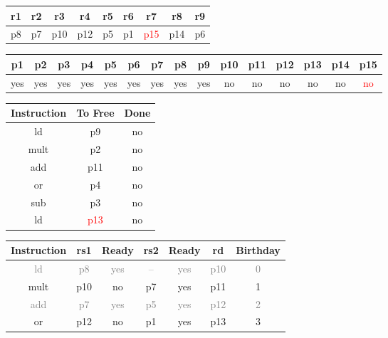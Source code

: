 \documentclass[12pt]{article}
\begin{document}
\begin{enumerate}
			\begin{table}[H]
				\begin{tabular}{|c|c|c|c|c|c|c|c|c|}
					\hline
					r1 & r2 & r3 & r4 & r5 & r6 & r7 & r8 & r9\\
					\hline
					p8 & p7 & p10 & p12 & p5 & p1 & \textcolor{red}{p15} & p14 & p6\\
					\hline
				\end{tabular}
			\end{table}
			\begin{table}[H]
				\begin{tabular}{|c|c|c|c|c|c|c|c|c|c|c|c|c|c|c|}
					\hline
					p1 & p2 & p3 & p4 & p5 & p6 & p7 & p8 & p9 & p10 & p11 & p12 & p13 & p14 & p15\\
					\hline
					yes & yes & yes & yes & yes & yes & yes & yes & yes & no & no & no & no & no & \textcolor{red}{no}\\
					\hline
				\end{tabular}
			\end{table}
			\begin{table}[H]
				\begin{tabular}{|c|c|c|}
					\hline
					Instruction & To Free & Done\\
					\hline
					ld & p9 & no\\
					\hline
					mult & p2 & no\\
					\hline
					add & p11 & no\\
					\hline
					or & p4 & no\\
					\hline
					sub & p3 & no\\
					\hline
					ld & \textcolor{red}{p13} & no\\
					\hline
				\end{tabular}
				\hfill
				\begin{tabular}{|c|c|c|c|c|c|c|}
					\hline
					Instruction & rs1 & Ready & rs2 & Ready & rd & Birthday\\
					\hline
					\textcolor{gray}{ld} & \textcolor{gray}{p8} & \textcolor{gray}{yes} & \textcolor{gray}{--} & \textcolor{gray}{yes} & \textcolor{gray}{p10} & \textcolor{gray}{0}\\
					\hline
					mult & p10 & no & p7 & yes & p11 & 1\\
					\hline
					\textcolor{gray}{add} & \textcolor{gray}{p7} & \textcolor{gray}{yes} & \textcolor{gray}{p5} & \textcolor{gray}{yes} & \textcolor{gray}{p12} & \textcolor{gray}{2}\\
					\hline
					or & p12 & no & p1 & yes & p13 & 3\\

\end{tabular}
\end{table}
\end{enumerate}
\end{document}
